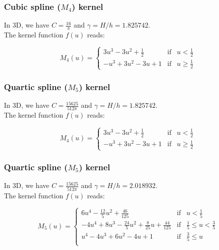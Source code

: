 \documentclass[a4paper]{mnras}
\begin{document}
\subsubsection{Cubic spline ($M_4$) kernel}

In 3D, we have $C=\frac{16}{\pi}$ and $\gamma=H/h = 1.825742$.\\
The kernel function $f(u)$ reads:

\begin{equation}
  M_4(u) = \left\lbrace\begin{array}{rcl}
  3u^3 - 3u^2 + \frac{1}{2} & \mbox{if} & u<\frac{1}{2}\\
  -u^3 + 3u^2 - 3u + 1 & \mbox{if} & u \geq \frac{1}{2}
  \end{array}
  \right.
    \nonumber
\end{equation}


\subsubsection{Quartic spline ($M_5$) kernel}

In 3D, we have $C=\frac{15625}{512\pi}$ and $\gamma=H/h = 1.825742$.\\
The kernel function $f(u)$ reads:

\begin{equation}
  M_4(u) = \left\lbrace\begin{array}{rcl}
  3u^3 - 3u^2 + \frac{1}{2} & \mbox{if} & u<\frac{1}{2}\\
  -u^3 + 3u^2 - 3u + 1 & \mbox{if} & u \geq \frac{1}{2}
  \end{array}
  \right.
    \nonumber
\end{equation}


\subsubsection{Quartic spline ($M_5$) kernel}

In 3D, we have $C=\frac{15625}{512\pi}$ and $\gamma=H/h = 2.018932$.\\
The kernel function $f(u)$ reads:

\begin{equation}
  M_5(u) = \left\lbrace\begin{array}{rcl}
  6u^4 - \frac{12}{5}u^2 + \frac{46}{125} & \mbox{if} & u < \frac{1}{5} \\
  -4u^4 + 8u^3  - \frac{24}{5}u^2 + \frac{8}{25}u + \frac{44}{125} &  \mbox{if} &  \frac{1}{5} \leq u < \frac{3}{5}\\
  u^4 - 4u^3 + 6u^2 - 4u + 1 &  \mbox{if} &  \frac{3}{5} \leq u \\
  \end{array}
  \right.
  \nonumber
\end{equation}
\end{document}
